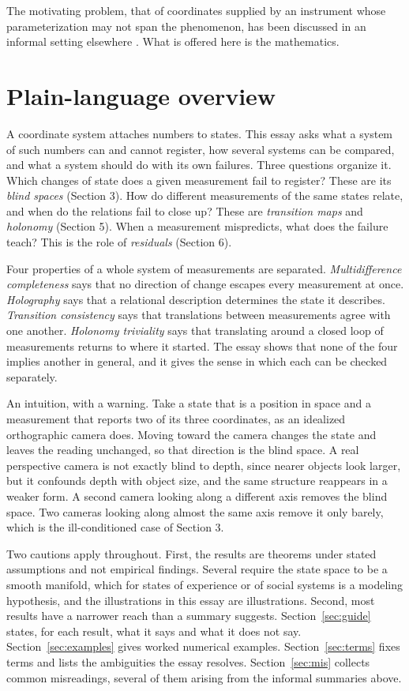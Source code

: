 \documentclass[11pt]{article}
\theoremstyle{remark}
\begin{document}
The motivating problem, that of coordinates supplied by an instrument whose parameterization may not span the phenomenon, has been discussed in an informal setting elsewhere \cite{flyxion}. What is offered here is the mathematics.

\section*{Plain-language overview}

A coordinate system attaches numbers to states. This essay asks what a system of such numbers can and cannot register, how several systems can be compared, and what a system should do with its own failures. Three questions organize it. Which changes of state does a given measurement fail to register? These are its \emph{blind spaces} (Section 3). How do different measurements of the same states relate, and when do the relations fail to close up? These are \emph{transition maps} and \emph{holonomy} (Section 5). When a measurement mispredicts, what does the failure teach? This is the role of \emph{residuals} (Section 6).

Four properties of a whole system of measurements are separated. \emph{Multidifference completeness} says that no direction of change escapes every measurement at once. \emph{Holography} says that a relational description determines the state it describes. \emph{Transition consistency} says that translations between measurements agree with one another. \emph{Holonomy triviality} says that translating around a closed loop of measurements returns to where it started. The essay shows that none of the four implies another in general, and it gives the sense in which each can be checked separately.

An intuition, with a warning. Take a state that is a position in space and a measurement that reports two of its three coordinates, as an idealized orthographic camera does. Moving toward the camera changes the state and leaves the reading unchanged, so that direction is the blind space. A real perspective camera is not exactly blind to depth, since nearer objects look larger, but it confounds depth with object size, and the same structure reappears in a weaker form. A second camera looking along a different axis removes the blind space. Two cameras looking along almost the same axis remove it only barely, which is the ill-conditioned case of Section 3.

Two cautions apply throughout. First, the results are theorems under stated assumptions and not empirical findings. Several require the state space to be a smooth manifold, which for states of experience or of social systems is a modeling hypothesis, and the illustrations in this essay are illustrations. Second, most results have a narrower reach than a summary suggests. Section~\ref{sec:guide} states, for each result, what it says and what it does not say. Section~\ref{sec:examples} gives worked numerical examples. Section~\ref{sec:terms} fixes terms and lists the ambiguities the essay resolves. Section~\ref{sec:mis} collects common misreadings, several of them arising from the informal summaries above.
\end{document}
